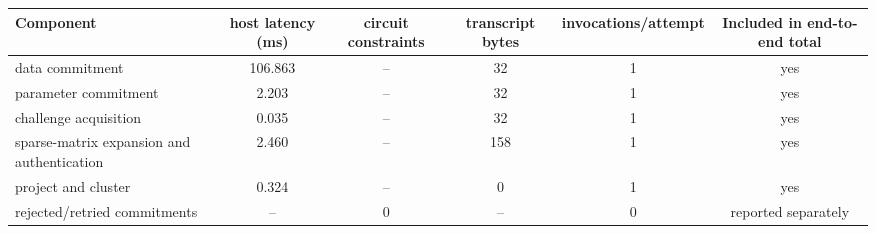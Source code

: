 \begin{tabular}{lccccc}
\toprule
Component & host latency (ms) & circuit constraints & transcript bytes & invocations/attempt & Included in end-to-end total \\
\midrule
data commitment & 106.863 & -- & 32 & 1 & yes \\
parameter commitment & 2.203 & -- & 32 & 1 & yes \\
challenge acquisition & 0.035 & -- & 32 & 1 & yes \\
sparse-matrix expansion and authentication & 2.460 & -- & 158 & 1 & yes \\
project and cluster & 0.324 & -- & 0 & 1 & yes \\
rejected/retried commitments & -- & 0 & -- & 0 & reported separately \\
\bottomrule
\end{tabular}
